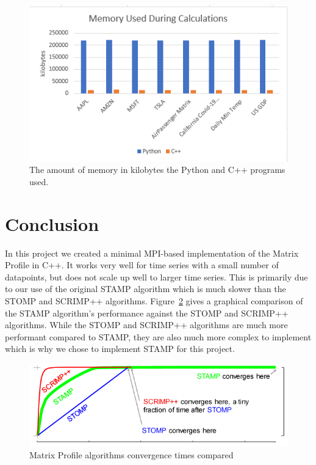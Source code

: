 \documentclass[conference]{IEEEtran}
\begin{document}
\begin{figure}
\begin{center}
\includegraphics[scale=1.05]{Memory.png}
\caption{The amount of memory in kilobytes the Python and C++ programs used.}
\label{fig:Memory_Graph}
\end{center}
\end{figure}
\section{Conclusion}
In this project we created a minimal MPI-based implementation of the Matrix Profile in C++.  It works very well for time series with a small number of datapoints, but does not scale up well to larger time series.  This is primarily due to our use of the original STAMP algorithm which is much slower than the STOMP and SCRIMP++ algorithms. Figure~\ref{fig:matrix_profile_algorithms_compared} gives a graphical comparison of the STAMP algorithm's performance against the STOMP and SCRIMP++ algorithms.  While the STOMP and SCRIMP++ algorithms are much more performant compared to STAMP, they are also much more complex to implement which is why we chose to implement STAMP for this project. 

\begin{figure}
\begin{center}
\includegraphics[scale=0.85]{matrix_profile_algorithms_compared.png}
\caption{Matrix Profile algorithms convergence times compared}
\label{fig:matrix_profile_algorithms_compared}
\end{center}
\end{figure}
\end{document}
